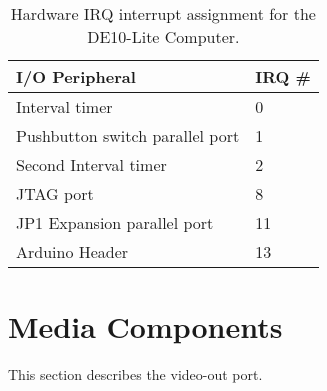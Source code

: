 

\begin{table}[h]
    \begin{center}
    \begin{tabular}{l|l}
            \textbf{I/O Peripheral} &
            \textbf{IRQ \#}
        \\\hline
            Interval timer & 0 \\
            Pushbutton switch parallel port & 1 \\
            Second Interval timer & 2 \\
            JTAG port & 8 \\
            JP1 Expansion parallel port & 11 \\
           	Arduino Header & 13 \\
    \end{tabular}
    \caption{Hardware IRQ interrupt assignment for the DE10-Lite Computer.}
	 \label{tab:irq}
    \end{center}
\end{table}









\section{Media Components}
\label{sec:multi}

This section describes the video-out port.



